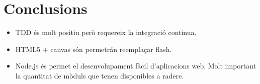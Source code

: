 \chapter{Conclusions}


\begin{itemize}
\item{TDD és molt positiu però requereix la integració continua.}
\item{HTML5 + canvas són permetrán reemplaçar flash.}
\item{Node.js és permet el desenvolupament fàcil d'aplicacions web. Molt important la quantitat de mòduls que tenen disponibles a radere.}
\end{itemize}
